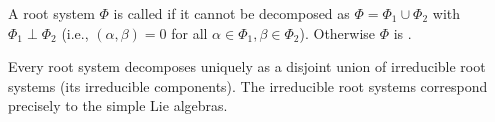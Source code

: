 A root system $\Phi$ is called  if it cannot be decomposed as $\Phi = \Phi_1 \cup \Phi_2$ with $\Phi_1 \perp \Phi_2$ (i.e., $(\alpha, \beta) = 0$ for all $\alpha \in \Phi_1, \beta \in \Phi_2$). Otherwise $\Phi$ is .

Every root system decomposes uniquely as a disjoint union of irreducible root systems (its irreducible components). The irreducible root systems correspond precisely to the simple Lie algebras.
